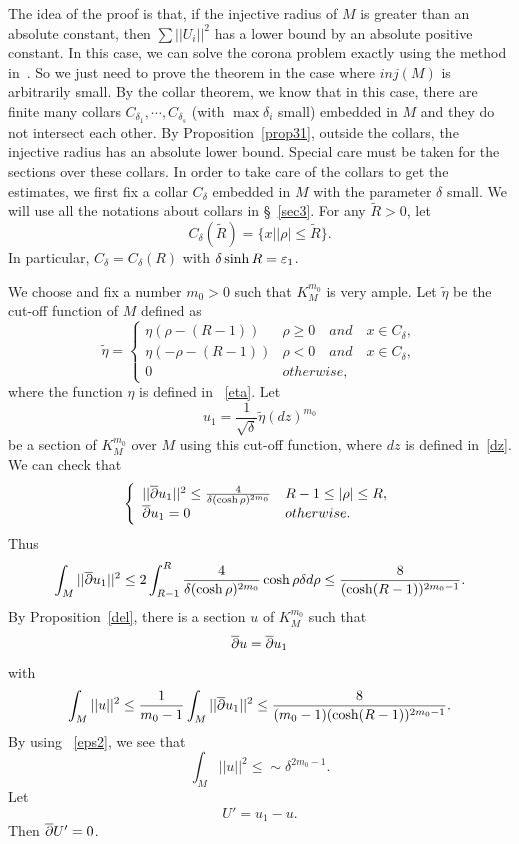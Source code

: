 The idea of the proof is that, if the injective radius of $M$ is greater
than
an absolute  constant, then $\sum||U_i||^2$ has a lower bound by an
absolute
 positive constant. In this case, we can solve the corona problem
exactly using the method in~\cite{JBG}. So  we just need to prove the
theorem in the case where $inj(M)$ is arbitrarily small. By the collar
theorem, we know that in this case, there are finite many collars
$C_{\delta_1},\cdots, C_{\delta_s}$ 
(with $\max\delta_i$ small)
embedded in $M$ and they do not
intersect each other. By Proposition~\ref{prop31}, outside the collars,
the injective radius has an absolute lower bound. Special
care must be taken for the sections over these collars.
In order to take care of the collars to get the estimates, 
we first fix a
collar $C_\delta$ embedded in $M$ with the parameter $\delta$
small. We will use all the notations about collars in \S~\ref{sec3}.
For any $\tilde R>0$, 
let
\[
C_\delta(\tilde R)=\{x||\rho|\leq\tilde R\}.
\]
In particular, $C_\delta=C_\delta(R)$ with
$\delta\sinh R=\varepsilon_1$.

We choose and fix a number $m_0>0$ such that $K_M^{m_0}$ is very ample. 
Let $\tilde\eta$ be the cut-off function of $M$ defined as
\begin{equation}\label{etai}
\tilde\eta=
\left\{
\begin{array}{ll}
\eta(\rho-(R-1)) &\rho\geq 0\quad and\quad x\in C_\delta,\\
\eta(-\rho-(R-1)) & \rho<0\quad and\quad x\in C_\delta,\\
0 & otherwise,
\end{array}
\right.
\end{equation}
where the function $\eta$ is defined in ~\eqref{eta}.
Let
\begin{equation}\label{5-u1}
u_1=\frac{1}{\sqrt\delta}\tilde \eta(dz)^{m_0}
\end{equation}
be a section of $K_M^{m_0}$ over $M$ using this cut-off function,
where $dz$ is defined
in~\eqref{dz}.
We can check that
\[
\left\{
\begin{array}{ll}
||\overline{\partial} u_1||^2\leq\frac{4}{\delta(\cosh\rho)^{2m_0}} &
R-1\leq|\rho|\leq
R,\\
\overline{\partial} u_1=0 & otherwise.
\end{array}
\right.
\]
 Thus
\[
\int_M||\overline{\partial} u_1||^2\leq 2\int_{R-1}^R
\frac{4}{\delta(\cosh\rho)^{2m_0}}\cosh\rho\delta d\rho
\leq \frac{8}{(\cosh (R-1))^{2{m_0}-1}}.
\]
By Proposition~\ref{del}, there is a section $u$ of $K_M^{m_0}$ such that
\[
\overline{\partial} u=\overline{\partial} u_1
\]
with 
\[
\int_M||u||^2\leq\frac{1}{m_0-1}\int_M||\overline{\partial} u_1||^2
\leq\frac{8}{(m_0-1)(\cosh (R-1))^{2m_0-1}}.
\]
By using ~\eqref{eps2}, we see that
\begin{equation}\label{5-u3}
\int_M ||u||^2\leq\sim\delta^{2m_0-1}.
\end{equation}
Let 
\begin{equation}\label{5-defu}
U'=u_1-u.
\end{equation}
Then $\overline{\partial} U'=0$. 


